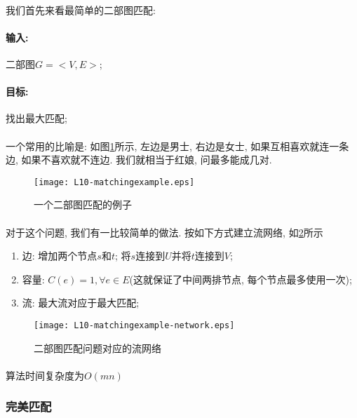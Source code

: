         \paragraph{}我们首先来看最简单的二部图匹配:
        \paragraph{输入:} 二部图$G=<V,E>$;
        \paragraph{目标: } 找出最大匹配;
        \paragraph{}一个常用的比喻是: 如图\figurename\ref{Figure: matching_example}所示, 左边是男士, 右边是女士, 如果互相喜欢就连一条边, 如果不喜欢就不连边. 我们就相当于红娘, 问最多能成几对.
    \begin{figure}[h]
        \centering
        \texttt{[image: L10-matchingexample.eps]}
        \caption{一个二部图匹配的例子}
        \label{Figure: matching_example}
    \end{figure}
    \paragraph{}对于这个问题, 我们有一比较简单的做法. 按如下方式建立流网络, 如\figurename\ref{Figure: matching_example_network}所示
    \begin{enumerate}
\item 边: 增加两个节点$s$和$t$; 将$s$连接到$U$并将$t$连接到$V$;
\item 容量: $C(e)=1, \forall e\in E$(这就保证了中间两排节点, 每个节点最多使用一次);
\item 流: 最大流对应于最大匹配;
\end{enumerate}
    \begin{figure}[h]
        \centering
        \texttt{[image: L10-matchingexample-network.eps]}
        \caption{二部图匹配问题对应的流网络}
        \label{Figure: matching_example_network}
    \end{figure}
    \paragraph{}算法时间复杂度为$O(mn)$
        \subsubsection{完美匹配}
